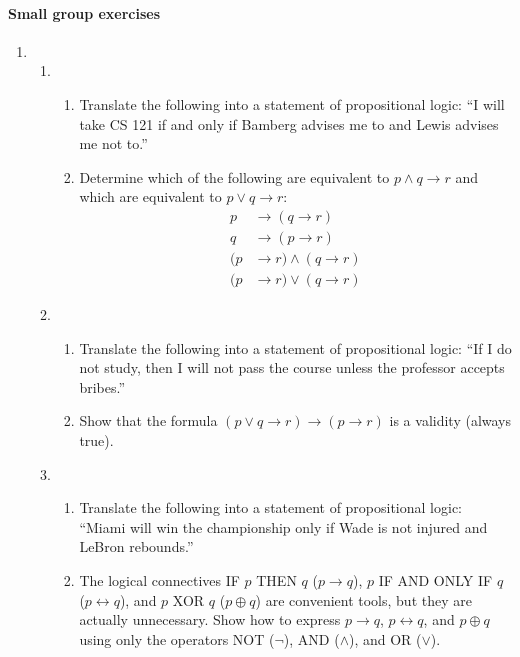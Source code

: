 \documentclass[12pt]{article}
\begin{document}
\paragraph*{Small group exercises}
\begin{enumerate}
\item

\begin{enumerate}

\item 
\begin{enumerate}
	\item Translate the following into a statement of propositional logic: ``I will take CS 121 if and only if Bamberg advises me to and Lewis advises me not to.''
	
	\item Determine which of the following are equivalent to $p \wedge q \rightarrow r$ and which are equivalent to $p \vee q \rightarrow r$:
	\begin{align*}
		p &\rightarrow (q \rightarrow r) \\
		q &\rightarrow (p \rightarrow r) \\
		(p &\rightarrow r) \wedge (q \rightarrow r) \\
		(p &\rightarrow r) \vee (q \rightarrow r)
	\end{align*}
\end{enumerate}

\item 
\begin{enumerate}
	\item Translate the following into a statement of propositional logic: ``If I do not study, then I will not pass the course unless the professor accepts bribes.''
	
	\item Show that the formula $(p \vee q \rightarrow r) \rightarrow (p \rightarrow r)$ is a validity (always true).
\end{enumerate}

\item 
\begin{enumerate}
	\item Translate the following into a statement of propositional logic: ``Miami will win the championship only if Wade is not injured and LeBron rebounds.''
	
	\item The logical connectives IF $p$ THEN $q$ ($p \rightarrow q$), $p$ IF AND ONLY IF $q$ ($p \leftrightarrow q$), and $p$ XOR $q$ ($p \oplus q$) are convenient tools, but they are actually unnecessary. Show how to express $p \rightarrow q$, $p \leftrightarrow q$, and $p \oplus q$ using only the operators NOT ($\neg$), AND ($\wedge$), and OR ($\vee$).
\end{enumerate}


\end{enumerate}
\end{enumerate}
\end{document}
